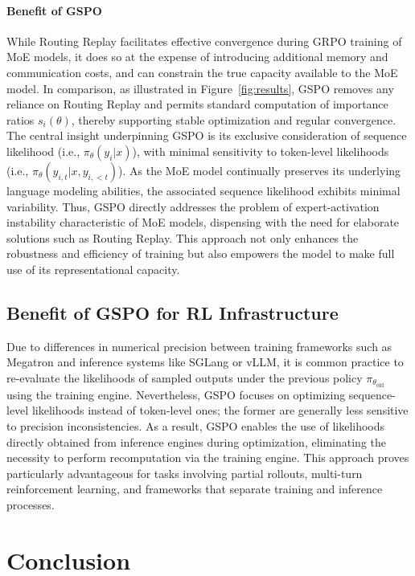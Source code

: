 \paragraph{Benefit of GSPO} While Routing Replay facilitates effective convergence during GRPO training of MoE models, it does so at the expense of introducing additional memory and communication costs, and can constrain the true capacity available to the MoE model. In comparison, as illustrated in Figure~\ref{fig:results}, GSPO removes any reliance on Routing Replay and permits standard computation of importance ratios $s_i(\theta)$, thereby supporting stable optimization and regular convergence. The central insight underpinning GSPO is its exclusive consideration of sequence likelihood (i.e., $\pi_{\theta} (y_i | x)$), with minimal sensitivity to token-level likelihoods (i.e., $\pi_{\theta} (y_{i,t} | x, y_{i,<t})$). As the MoE model continually preserves its underlying language modeling abilities, the associated sequence likelihood exhibits minimal variability. Thus, GSPO directly addresses the problem of expert-activation instability characteristic of MoE models, dispensing with the need for elaborate solutions such as Routing Replay. This approach not only enhances the robustness and efficiency of training but also empowers the model to make full use of its representational capacity.

\subsection{Benefit of GSPO for RL Infrastructure}

Due to differences in numerical precision between training frameworks such as Megatron and inference systems like SGLang or vLLM, it is common practice to re-evaluate the likelihoods of sampled outputs under the previous policy $\pi_{\theta_\text{old}}$ using the training engine. Nevertheless, GSPO focuses on optimizing sequence-level likelihoods instead of token-level ones; the former are generally less sensitive to precision inconsistencies. As a result, GSPO enables the use of likelihoods directly obtained from inference engines during optimization, eliminating the necessity to perform recomputation via the training engine. This approach proves particularly advantageous for tasks involving partial rollouts, multi-turn reinforcement learning, and frameworks that separate training and inference processes.

\section{Conclusion}

